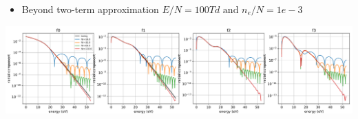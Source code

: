 \documentclass[landscape,archE,fontscale=0.285]{baposter} %
\begin{document}
\begin{poster}
{\begin{center}
\begin{minipage}{0.83\textwidth}
	\end{minipage}
	\end{center}
	\begin{itemize}
		\item Beyond two-term approximation $E/N = 100Td \text{ and } n_e/N=1e-3$
	\end{itemize}
	\begin{center}
	\begin{minipage}{0.83\textwidth}
		\includegraphics[width=\textwidth]{100Td_ion_deg1e-3.png}
	\end{minipage}
	\end{center}


}
\end{poster}
\end{document}
